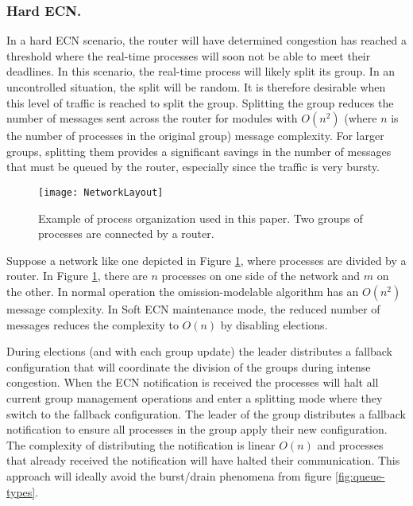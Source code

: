 \subsubsection{Hard \ac{ECN}.}

In a hard \ac{ECN} scenario, the router will have determined congestion has reached a threshold where the real-time processes will soon not be able to meet their deadlines.
In this scenario, the real-time process will likely split its group.
In an uncontrolled situation, the split will be random.
It is therefore desirable when this level of traffic is reached to split the group.
Splitting the group reduces the number of messages sent across the router for modules with $O(n^2)$ (where $n$ is the number of processes in the original group) message complexity.
For larger groups, splitting them provides a significant savings in the number of messages that must be queued by the router, especially since the traffic is very bursty.

\begin{figure}
\centering
\texttt{[image: NetworkLayout]}
\caption{Example of process organization used in this paper. Two groups of processes are connected by a router.} \label{fig:network-layout}
\end{figure}

Suppose a network like one depicted in Figure \ref{fig:network-layout}, where processes are divided by a router.
In Figure \ref{fig:network-layout}, there are $n$ processes on one side of the network and $m$ on the other.
In normal operation the omission-modelable algorithm has an $O(n^2)$ message complexity.
In Soft \ac{ECN} maintenance mode, the reduced number of messages reduces the complexity to $O(n)$ by disabling elections.

During elections (and with each group update) the leader distributes a fallback configuration that will coordinate the division of the groups during intense congestion.
When the \ac{ECN} notification is received the processes will halt all current group management operations and enter a splitting mode where they switch to the fallback configuration.
The leader of the group distributes a fallback notification to ensure all processes in the group apply their new configuration. 
The complexity of distributing the notification is linear $O(n)$ and processes that already received the notification will have halted their communication.
This approach will ideally avoid the burst/drain phenomena from figure \ref{fig:queue-types}.

